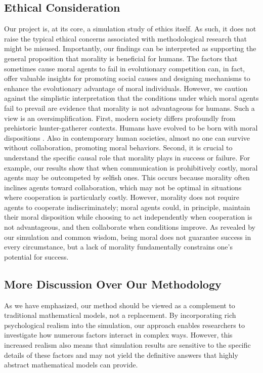 \subsection{Ethical Consideration}
Our project is, at its core, a simulation study of ethics itself. As such, it does not raise the typical ethical concerns associated with methodological research that might be misused.
Importantly, our findings can be interpreted as supporting the general proposition that morality is beneficial for humans. The factors that sometimes cause moral agents to fail in evolutionary competition can, in fact, offer valuable insights for promoting social causes and designing mechanisms to enhance the evolutionary advantage of moral individuals.
However, we caution against the simplistic interpretation that the conditions under which moral agents fail to prevail are evidence that morality is not advantageous for humans. Such a view is an oversimplification. First, modern society differs profoundly from prehistoric hunter-gatherer contexts. Humans have evolved to be born with moral dispositions \citep{hamlin2011young, bloom2013just, warneken2006altruistic}. Also in contemporary human societies, almost no one can survive without collaboration, promoting moral behaviors. Second, it is crucial to understand the specific causal role that morality plays in success or failure. For example, our results show that when communication is prohibitively costly, moral agents may be outcompeted by selfish ones. This occurs because morality often inclines agents toward collaboration, which may not be optimal in situations where cooperation is particularly costly. However, morality does not require agents to cooperate indiscriminately; moral agents could, in principle, maintain their moral disposition while choosing to act independently when cooperation is not advantageous, and then collaborate when conditions improve. As revealed by our simulation and common wisdom, being moral does not guarantee success in every circumstance, but a lack of morality fundamentally constrains one's potential for success.

\subsection{More Discussion Over Our Methodology}
As we have emphasized, our method should be viewed as a complement to traditional mathematical models, not a replacement. By incorporating rich psychological realism into the simulation, our approach enables researchers to investigate how numerous factors interact in complex ways. However, this increased realism also means that simulation results are sensitive to the specific details of these factors and may not yield the definitive answers that highly abstract mathematical models can provide.

